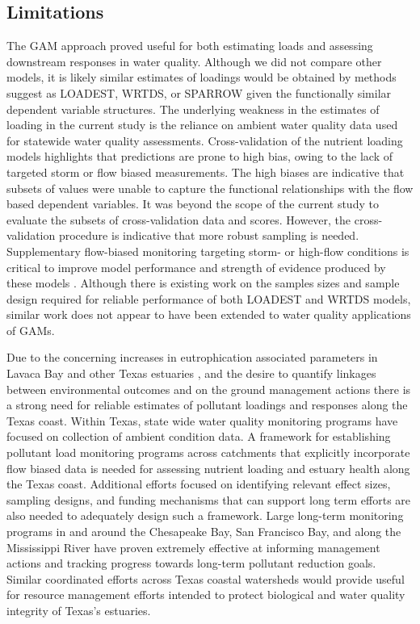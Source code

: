 \documentclass[fleqn,10pt,lineno]{wlpeerj} %
\begin{document}
\hypertarget{limitations}{%
\subsection*{Limitations}\label{limitations}}

The GAM approach proved useful for both estimating loads and assessing
downstream responses in water quality. Although we did not compare other
models, it is likely similar estimates of loadings would be obtained by
methods suggest as LOADEST, WRTDS, or SPARROW given the functionally
similar dependent variable structures. The underlying weakness in the
estimates of loading in the current study is the reliance on ambient
water quality data used for statewide water quality assessments.
Cross-validation of the nutrient loading models highlights that
predictions are prone to high bias, owing to the lack of targeted storm
or flow biased measurements. The high biases are indicative that subsets
of values were unable to capture the functional relationships with the
flow based dependent variables. It was beyond the scope of the current
study to evaluate the subsets of cross-validation data and scores.
However, the cross-validation procedure is indicative that more robust
sampling is needed. Supplementary flow-biased monitoring targeting
storm- or high-flow conditions is critical to improve model performance
and strength of evidence produced by these models
\autocite{horowitzEvaluationSedimentRating2003,snelderEstimationCatchmentNutrient2017}.
Although there is existing work on the samples sizes and sample design
required for reliable performance of both LOADEST
\autocite{parkUsePollutantLoad2014} and WRTDS
\autocite{kumarValueIntensiveSampling2019} models, similar work does not
appear to have been extended to water quality applications of GAMs.

Due to the concerning increases in eutrophication associated parameters
in Lavaca Bay and other Texas estuaries \autocite{bugica_water_2020},
and the desire to quantify linkages between environmental outcomes and
on the ground management actions \autocite{schrammTotalMaximumDaily2022}
there is a strong need for reliable estimates of pollutant loadings and
responses along the Texas coast. Within Texas, state wide water quality
monitoring programs have focused on collection of ambient condition
data. A framework for establishing pollutant load monitoring programs
across catchments that explicitly incorporate flow biased data is needed
for assessing nutrient loading and estuary health along the Texas coast.
Additional efforts focused on identifying relevant effect sizes,
sampling designs, and funding mechanisms that can support long term
efforts are also needed to adequately design such a framework. Large
long-term monitoring programs in and around the Chesapeake Bay, San
Francisco Bay, and along the Mississippi River have proven extremely
effective at informing management actions and tracking progress towards
long-term pollutant reduction goals. Similar coordinated efforts across
Texas coastal watersheds would provide useful for resource management
efforts intended to protect biological and water quality integrity of
Texas's estuaries.
\end{document}
